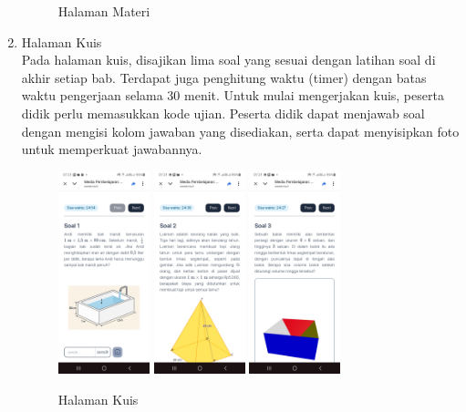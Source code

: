 \documentclass[12pt]{article}
\begin{document}
\begin{enumerate}
\begin{figure}[H]
        \caption{Halaman Materi}
        \label{fig:materi}
    \end{figure}

    \item Halaman Kuis\\
    \hspace*{1cm}Pada halaman kuis, disajikan lima soal yang sesuai dengan latihan soal di akhir setiap bab. Terdapat juga penghitung waktu (timer) dengan batas waktu pengerjaan selama 30 menit. Untuk mulai mengerjakan kuis, peserta didik perlu memasukkan kode ujian. Peserta didik dapat menjawab soal dengan mengisi kolom jawaban yang disediakan, serta dapat menyisipkan foto untuk memperkuat jawabannya.
    \begin{figure}[H]
        \centering
        \includegraphics[width=0.25\textwidth]{images/kuis1.jpg}
        \includegraphics[width=0.25\textwidth]{images/kuis2.jpg}
        \includegraphics[width=0.25\textwidth]{images/kuis3.jpg}
        \caption{Halaman Kuis}
        \label{fig:kuis}
    \end{figure}

\end{enumerate}
\newpage

\end{document}
